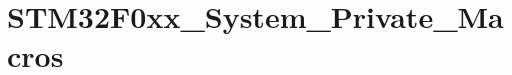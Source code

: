 \hypertarget{group___s_t_m32_f0xx___system___private___macros}{}\section{S\+T\+M32\+F0xx\+\_\+\+System\+\_\+\+Private\+\_\+\+Macros}
\label{group___s_t_m32_f0xx___system___private___macros}
